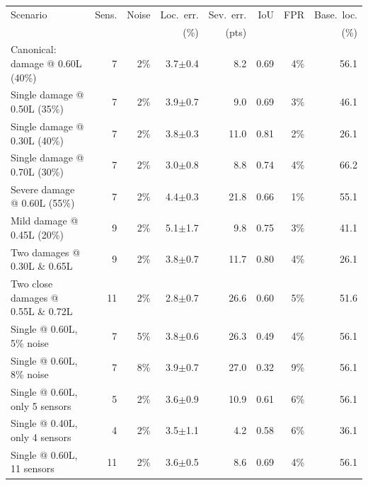 \begin{tabular}{lrrrrrrr}
\toprule
Scenario & Sens. & Noise & Loc.\ err. & Sev.\ err. & IoU & FPR & Base.\ loc. \\
 &  &  & (\%) & (pts) &  &  & (\%) \\
\midrule
Canonical: damage @ 0.60L (40\%) & 7 & 2\% & 3.7$\pm$0.4 & 8.2 & 0.69 & 4\% & 56.1 \\
Single damage @ 0.50L (35\%) & 7 & 2\% & 3.9$\pm$0.7 & 9.0 & 0.69 & 3\% & 46.1 \\
Single damage @ 0.30L (40\%) & 7 & 2\% & 3.8$\pm$0.3 & 11.0 & 0.81 & 2\% & 26.1 \\
Single damage @ 0.70L (30\%) & 7 & 2\% & 3.0$\pm$0.8 & 8.8 & 0.74 & 4\% & 66.2 \\
Severe damage @ 0.60L (55\%) & 7 & 2\% & 4.4$\pm$0.3 & 21.8 & 0.66 & 1\% & 55.1 \\
Mild damage @ 0.45L (20\%) & 9 & 2\% & 5.1$\pm$1.7 & 9.8 & 0.75 & 3\% & 41.1 \\
Two damages @ 0.30L \& 0.65L & 9 & 2\% & 3.8$\pm$0.7 & 11.7 & 0.80 & 4\% & 26.1 \\
Two close damages @ 0.55L \& 0.72L & 11 & 2\% & 2.8$\pm$0.7 & 26.6 & 0.60 & 5\% & 51.6 \\
Single @ 0.60L, 5\% noise & 7 & 5\% & 3.8$\pm$0.6 & 26.3 & 0.49 & 4\% & 56.1 \\
Single @ 0.60L, 8\% noise & 7 & 8\% & 3.9$\pm$0.7 & 27.0 & 0.32 & 9\% & 56.1 \\
Single @ 0.60L, only 5 sensors & 5 & 2\% & 3.6$\pm$0.9 & 10.9 & 0.61 & 6\% & 56.1 \\
Single @ 0.40L, only 4 sensors & 4 & 2\% & 3.5$\pm$1.1 & 4.2 & 0.58 & 6\% & 36.1 \\
Single @ 0.60L, 11 sensors & 11 & 2\% & 3.6$\pm$0.5 & 8.6 & 0.69 & 4\% & 56.1 \\
\bottomrule
\end{tabular}
